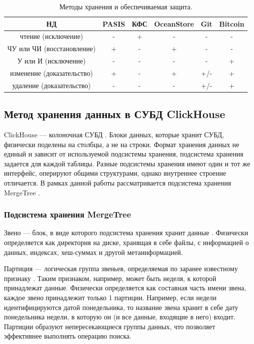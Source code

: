 \begin{table}[h]
    \begin{center}
        \caption{Методы хранения и обеспечиваемая защита.}
        \label{tab:res}
        \begin{tabular}{|c|c|c|c|c|c|}
            \hline
            \bfseries НД & \bfseries PASIS & \bfseries КФС & \bfseries OceanStore & \bfseries Git & \bfseries Bitcoin  \\
            \hline
            чтение (исключение) & - & + & - & - & - \\ \hline
            ЧУ или ЧИ (восстановление) & + & - & + & - & - \\ \hline
            У или И (исключение) & - & - & - & - & + \\ \hline
            изменение (доказательство) & + & - & + & +/- & + \\ \hline
            удаление (доказательство) & - & - & - & +/- & + \\ \hline
        \end{tabular}
    \end{center}
\end{table}

\clearpage

\subsection{Метод хранения данных в СУБД ClickHouse}

ClickHouse --- колоночная СУБД \cite{ch}. Блоки данных, которые хранит СУБД, физически поделены на столбцы, а не на строки. Формат хранения данных не единый и зависит от используемой подсистемы хранения, подсистема хранения задается для каждой таблицы. Разные подсистемы хранения имеют один и тот же интерфейс, оперируют общими структурами, однако внутреннее строение отличается. В рамках данной работы рассматривается подсистема хранения MergeTree \cite{mergetree}.

\subsubsection{Подсистема хранения MergeTree}

Звено --- блок, в виде которого подсистема хранения хранит данные \cite{mergetreearch}. Физически определяется как директория на диске, хранящая в себе файлы, с информацией о данных, индексах, хеш-суммах и другой метаинформацией.

Партиция --- логическая группа звеньев, определяемая по заранее известному признаку \cite{mergetreearch}. Таким признаком, например, может быть неделя, к которой принадлежат данные. Физически определяется как составная часть имени звена, каждое звено принадлежит только 1 партиции. Например, если недели идентифицируются датой понедельника, то название звена хранит в себе дату понедельника недели, в которую он (и все данные, входящие в него) входит. Партиции образуют непересекающиеся группы данных, что позволяет эффективнее выполнять операцию поиска.

